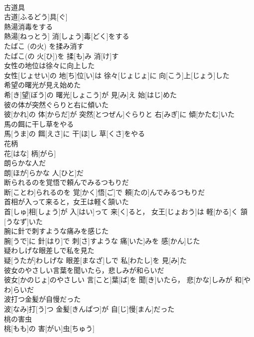 \documentclass[8pt]{extreport}
\begin{document}
\begin{CJK}{UTF8}{min}
\\	古道具	
\\	古道[ふるどう]具[ぐ]
\\	熱湯消毒をする	
\\	熱湯[ねっとう] 消[しょう]毒[どく]をする
\\	たばこ (の火) を揉み消す	
\\	たばこ(の 火[ひ])を 揉[も]み 消[け]す
\\	女性の地位は徐々に向上した	
\\	女性[じょせい]の 地[ち]位[い]は 徐々[じょじょ]に 向[こう]上[じょう]した
\\	希望の曙光が見え始めた	
\\	希[き]望[ぼう]の 曙光[しょこう]が 見[み]え 始[はじ]めた
\\	彼の体が突然ぐらりと右に傾いた	
\\	彼[かれ]の 体[からだ]が 突然[とつぜん]ぐらりと 右[みぎ]に 傾[かたむ]いた
\\	馬の餌に干し草をやる	
\\	馬[うま]の 餌[えさ]に 干[ほ]し 草[くさ]をやる
\\	花柄	
\\	花[はな] 柄[がら]
\\	朗らかな人だ	
\\	朗[ほが]らかな 人[ひと]だ
\\	断られるのを覚悟で頼んでみるつもりだ	
\\	断[ことわ]られるのを 覚[かく]悟[ご]で 頼[たの]んでみるつもりだ
\\	首相が入って来ると，女王は軽く頷いた	
\\	首[しゅ]相[しょう]が 入[はい]って 来[く]ると， 女王[じょおう]は 軽[かる]く 頷[うなず]いた
\\	腕に針で刺すような痛みを感じた	
\\	腕[うで]に 針[はり]で 刺[さ]すような 痛[いた]みを 感[かん]じた
\\	疑わしげな眼差しで私を見た	
\\	疑[うたが]わしげな 眼差[まなざ]しで 私[わたし]を 見[み]た
\\	彼女のやさしい言葉を聞いたら，悲しみが和らいだ	
\\	彼女[かのじょ]のやさしい 言[こと]葉[ば]を 聞[き]いたら， 悲[かな]しみが 和[やわ]らいだ
\\	波打つ金髪が自慢だった	
\\	波[なみ]打[う]つ 金髪[きんぱつ]が 自[じ]慢[まん]だった
\\	桃の害虫	
\\	桃[もも]の 害[がい]虫[ちゅう]

\end{CJK}
\end{document}
